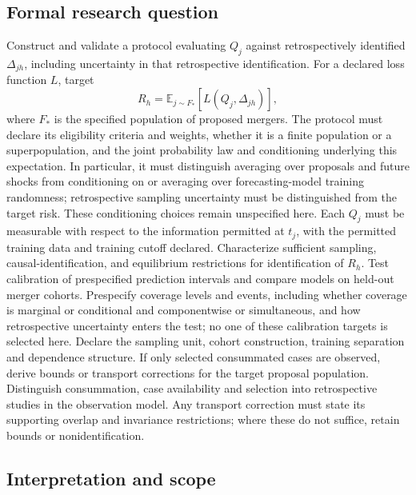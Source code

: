 \documentclass[11pt,a4paper]{article}
\begin{document}
\subsection*{Formal research question}

Construct and validate a protocol evaluating $Q_j$ against retrospectively identified $\Delta_{jh}$, including uncertainty in that retrospective identification. For a declared loss function $L$, target
\[
R_h=\mathbb E_{j\sim F_*}[L(Q_j,\Delta_{jh})],
\]
where $F_*$ is the specified population of proposed mergers. The protocol must declare its eligibility criteria and weights, whether it is a finite population or a superpopulation, and the joint probability law and conditioning underlying this expectation. In particular, it must distinguish averaging over proposals and future shocks from conditioning on or averaging over forecasting-model training randomness; retrospective sampling uncertainty must be distinguished from the target risk. These conditioning choices remain unspecified here. Each $Q_j$ must be measurable with respect to the information permitted at $t_j$, with the permitted training data and training cutoff declared. Characterize sufficient sampling, causal-identification, and equilibrium restrictions for identification of $R_h$. Test calibration of prespecified prediction intervals and compare models on held-out merger cohorts. Prespecify coverage levels and events, including whether coverage is marginal or conditional and componentwise or simultaneous, and how retrospective uncertainty enters the test; no one of these calibration targets is selected here. Declare the sampling unit, cohort construction, training separation and dependence structure. If only selected consummated cases are observed, derive bounds or transport corrections for the target proposal population. Distinguish consummation, case availability and selection into retrospective studies in the observation model. Any transport correction must state its supporting overlap and invariance restrictions; where these do not suffice, retain bounds or nonidentification.

\subsection*{Interpretation and scope}
\end{document}
